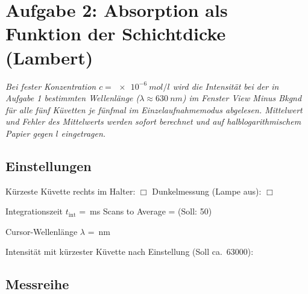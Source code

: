 \documentclass{article}
\newcommand{\bl}[1][2cm]{\underline{\hspace{#1}}}
\newcommand{\blu}[2][2cm]{\mbox{\bl[#1]\,\si{#2}}}
\newcommand{\ak}{$\Box$}
\newcommand{\was}[1]{\begingroup\small\itshape #1\par\endgroup\vspace{0.15cm}}
\begin{document}
\vspace{0.2cm}
\noindent \bl[15cm]

\vspace{0.6cm}
\noindent \bl[15cm]

\vspace{0.6cm}
\noindent \bl[15cm]

\newpage

\section{Aufgabe 2: Absorption als Funktion der Schichtdicke (Lambert)}

\was{Bei fester Konzentration $c = \SI{e-6}{mol/l}$ wird die Intensit\"at bei
der in Aufgabe 1 bestimmten Wellenl\"ange ($\lambda \approx \SI{630}{nm}$) im Fenster \emph{View Minus Bkgnd} f\"ur alle f\"unf
K\"uvetten je f\"unfmal im Einzelaufnahmemodus abgelesen. Mittelwert und Fehler des
Mittelwerts werden sofort berechnet und auf halblogarithmischem Papier gegen $l$
eingetragen.}

\subsection{Einstellungen}

\begin{center}
  K\"urzeste K\"uvette rechts im Halter: \ak{} \qquad
  Dunkelmessung (Lampe aus): \ak{}
\end{center}

\noindent Integrationszeit $t_\mathrm{int}$ = \blu[2.2cm]{ms} \qquad
Scans to Average = \bl[1.8cm] (Soll: 50)

\vspace{0.25cm}
\noindent Cursor-Wellenl\"ange $\lambda$ = \blu[1.8cm]{nm}

\vspace{0.25cm}
\noindent Intensit\"at mit k\"urzester K\"uvette nach Einstellung
(Soll ca.\ \SI{63000}{\counts}): \blu[2.5cm]{\counts}

\subsection{Messreihe}
\end{document}

